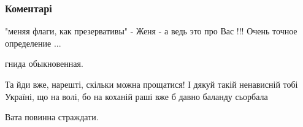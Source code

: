  
 
 
 
 
\subsubsection{Коментарі}
\label{sec:16_09_2021.fb.nikonov_sergej.1.bilchenko_theend_institut.cmt}

\begin{itemize} %
"меняя флаги, как презервативы" - Женя - а ведь это про Вас !!! Очень точное определение ...

гнида обыкновенная.

Та йди вже, нарешті, скільки можна прощатися! І дякуй такій ненависній тобі Україні, що на волі, бо на коханій раші вже б давно баланду сьорбала

Вата повинна страждати.
\end{itemize} %
